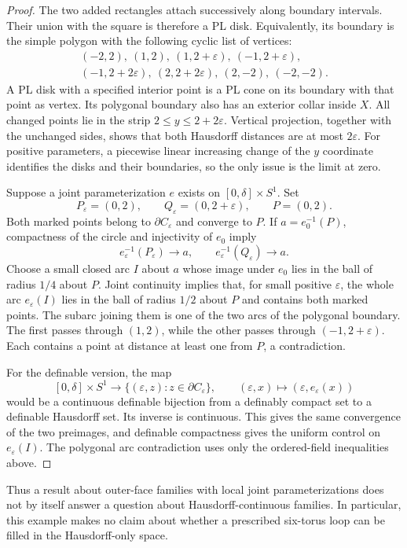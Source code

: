\begin{proof}
The two added rectangles attach successively along boundary intervals.
Their union with the square is therefore a PL disk.  Equivalently, its
boundary is the simple polygon with the following cyclic list of
vertices:
\[
 \begin{gathered}
 (-2,2),\ (1,2),\ (1,2+\varepsilon),\ (-1,2+\varepsilon),\\
 (-1,2+2\varepsilon),\ (2,2+2\varepsilon),\ (2,-2),\ (-2,-2).
 \end{gathered}
\]
A PL disk with a specified interior point is a PL cone on its boundary
with that point as vertex.  Its polygonal boundary also has an exterior
collar inside $X$.  All changed points lie in the strip
$2\leq y\leq2+2\varepsilon$.  Vertical projection, together with the
unchanged sides, shows that both Hausdorff distances are at most
$2\varepsilon$.  For positive parameters, a piecewise linear increasing
change of the $y$ coordinate identifies the disks and their boundaries,
so the only issue is the limit at zero.

Suppose a joint parameterization $e$ exists on $[0,\delta]\times S^1$.
Set
\[
 P_\varepsilon=(0,2),\qquad
 Q_\varepsilon=(0,2+\varepsilon),\qquad P=(0,2).
\]
Both marked points belong to $\partial C_\varepsilon$ and converge to
$P$.  If $a=e_0^{-1}(P)$, compactness of the circle and injectivity of
$e_0$ imply
\[
 e_\varepsilon^{-1}(P_\varepsilon)\longrightarrow a,
 \qquad
 e_\varepsilon^{-1}(Q_\varepsilon)\longrightarrow a.
\]
Choose a small closed arc $I$ about $a$ whose image under $e_0$ lies in
the ball of radius $1/4$ about $P$.  Joint continuity implies that, for
small positive $\varepsilon$, the whole arc $e_\varepsilon(I)$ lies in
the ball of radius $1/2$ about $P$ and contains both marked points.
The subarc joining them is one of the two arcs of the polygonal
boundary.  The first passes through $(1,2)$, while the other passes
through $(-1,2+\varepsilon)$.  Each contains a point at distance at
least one from $P$, a contradiction.

For the definable version, the map
\[
 [0,\delta]\times S^1\longrightarrow
 \{(\varepsilon,z):z\in\partial C_\varepsilon\},
 \qquad(\varepsilon,x)\longmapsto(\varepsilon,e_\varepsilon(x))
\]
would be a continuous definable bijection from a definably compact set
to a definable Hausdorff set.  Its inverse is continuous.  This gives
the same convergence of the two preimages, and definable compactness
gives the uniform control on $e_\varepsilon(I)$.  The polygonal arc
contradiction uses only the ordered-field inequalities above.
\end{proof}

Thus a result about outer-face families with local joint
parameterizations does not by itself answer a question about
Hausdorff-continuous families.  In particular, this example makes no
claim about whether a prescribed six-torus loop can be filled in the
Hausdorff-only space.

